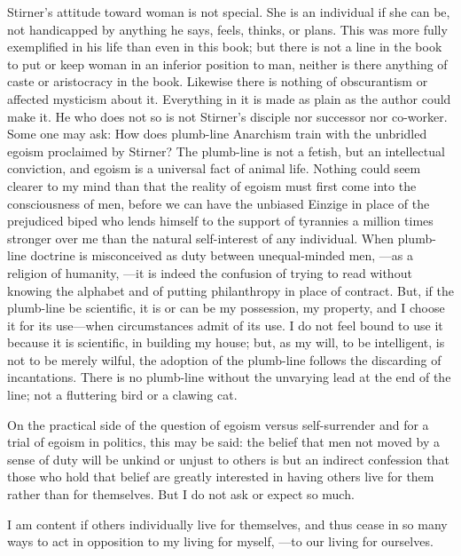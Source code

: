 Stirner's attitude toward woman is not special. She is an individual if she 
can be, not handicapped by anything he says, feels, thinks, or plans. This was 
more fully exemplified in his life than even in this book; but there is not a 
line in the book to put or keep woman in an inferior position to man, neither 
is there anything of caste or aristocracy in the book. Likewise there is 
nothing of obscurantism or affected mysticism about it. Everything in it is 
made as plain as the author could make it. He who does not so is not Stirner's 
disciple nor successor nor co-worker. Some one may ask: How does plumb-line 
Anarchism train with the unbridled egoism proclaimed by Stirner? The 
plumb-line is not a fetish, but an intellectual conviction, and egoism is a 
universal fact of animal life. Nothing could seem clearer to my mind than that 
the reality of egoism must first come into the consciousness of men, before we 
can have the unbiased Einzige in place of the prejudiced biped who lends 
himself to the support of tyrannies a million times stronger over me than the 
natural self-interest of any individual. When plumb-line doctrine is 
misconceived as duty between unequal-minded men, ---as a religion of humanity, ---it is indeed the confusion of trying to read without knowing the alphabet 
and of putting philanthropy in place of contract. But, if the plumb-line be 
scientific, it is or can be my possession, my property, and I choose it for 
its use---when circumstances admit of its use. I do not feel bound to use it 
because it is scientific, in building my house; but, as my will, to be 
intelligent, is not to be merely wilful, the adoption of the plumb-line 
follows the discarding of incantations. There is no plumb-line without the 
unvarying lead at the end of the line; not a fluttering bird or a clawing cat.

On the practical side of the question of egoism versus self-surrender and for 
a trial of egoism in politics, this may be said: the belief that men not moved 
by a sense of duty will be unkind or unjust to others is but an indirect 
confession that those who hold that belief are greatly interested in having 
others live for them rather than for themselves. But I do not ask or expect so 
much.

I am content if others individually live for themselves, and thus cease in so 
many ways to act in opposition to my living for myself, ---to our living for 
ourselves.


